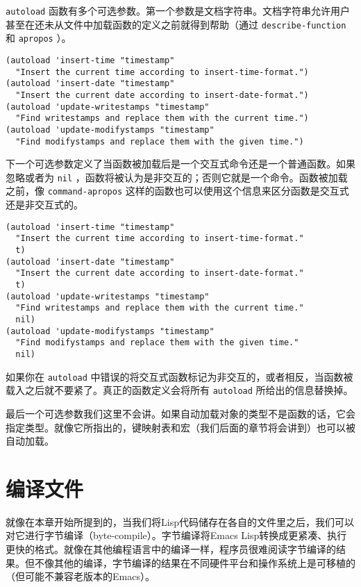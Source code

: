  \texttt{autoload} 函数有多个可选参数。第一个参数是文档字符串。文档字符串允许用户甚至在还未从文件中加载函数的定义之前就得到帮助（通过 \texttt{describe-function} 和 \texttt{apropos} ）。

\begin{verbatim}
(autoload 'insert-time "timestamp"
  "Insert the current time according to insert-time-format.")
(autoload 'insert-date "timestamp"
  "Insert the current date according to insert-date-format.")
(autoload 'update-writestamps "timestamp"
  "Find writestamps and replace them with the current time.")
(autoload 'update-modifystamps "timestamp"
  "Find modifystamps and replace them with the given time.")
\end{verbatim}

下一个可选参数定义了当函数被加载后是一个交互式命令还是一个普通函数。如果忽略或者为 \texttt{nil} ，函数将被认为是非交互的；否则它就是一个命令。函数被加载之前，像 \texttt{command-apropos} 这样的函数也可以使用这个信息来区分函数是交互式还是非交互式的。

\begin{verbatim}
(autoload 'insert-time "timestamp"
  "Insert the current time according to insert-time-format."
  t)
(autoload 'insert-date "timestamp"
  "Insert the current date according to insert-date-format."
  t)
(autoload 'update-writestamps "timestamp"
  "Find writestamps and replace them with the current time."
  nil)
(autoload 'update-modifystamps "timestamp"
  "Find modifystamps and replace them with the given time."
  nil)
\end{verbatim}

如果你在 \texttt{autoload} 中错误的将交互式函数标记为非交互的，或者相反，当函数被载入之后就不要紧了。真正的函数定义会将所有 \texttt{autoload} 所给出的信息替换掉。

最后一个可选参数我们这里不会讲。如果自动加载对象的类型不是函数的话，它会指定类型。就像它所指出的，键映射表和宏（我们后面的章节将会讲到）也可以被自动加载。

\section{编译文件}
\label{section:05-Compiling-the-File}

就像在本章开始所提到的，当我们将Lisp代码储存在各自的文件里之后，我们可以对它进行字节编译（byte-compile）。字节编译将Emacs Lisp转换成更紧凑、执行更快的格式。就像在其他编程语言中的编译一样，程序员很难阅读字节编译的结果。但不像其他的编译，字节编译的结果在不同硬件平台和操作系统上是可移植的（但可能不兼容老版本的Emacs）。

